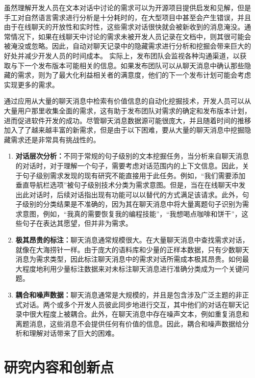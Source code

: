 虽然理解开发人员在文本对话中讨论的需求可以为开源项目提供启发和见解，但是手工对自然语言需求进行分析是十分耗时的，在大型项目中甚至会产生错误\cite{vlas2012two}，并且由于在线聊天的开放性和实时性，这些需求对话很快就会被新收到的消息淹没。通常情况下，如果在线聊天中讨论的需求未被开发人员记录在文档中，则其很可能会被淹没或忽略。因此，自动对聊天记录中的隐藏需求进行分析和挖掘会带来巨大的好处并减少开发人员的时间成本。
实际上，发布团队会监视各种沟通渠道，以获取与下一个发布版本可能相关的信息。如果发布团队可以从聊天消息中确认那些隐藏的需求，则为了最大化利益相关者的满意度，他们的下一个发布计划可能会考虑实现更多的需求。

通过应用从大量的聊天消息中检索有价值信息的自动化挖掘技术，开发人员可以从大量用户那里收集全面的需求，这有助于发布团队对需求的确定和发布版本计划，进而促进软件开发的成功。尽管聊天消息数据源可能很庞大，并且随着时间的推移加入了了越来越丰富的新需求，但是由于以下困难，要从大量的聊天消息中挖掘隐藏需求还是非常具有挑战性的。
\begin{enumerate}
    \item \textbf{对话层次分析：}不同于常规的句子级别的文本挖掘任务，当分析来自聊天消息的对话时，对于理解一个句子，需要考虑对话范围内的上下文信息。因此，关于句子级别需求发现的现有研究不能直接用于此任务。例如，“我们需要添加垂直导航栏选项”被句子级别技术分类为需求意图。但是，当在在线聊天中发出此对话时，后续对话指出现有功能可以以替代的方式满足该请求。此外，句子级别的分类结果是不准确的，因为其在聊天消息中将大量离题句子识别为需求意图，例如，“我真的需要恢复我的编程技能”，“我想喝点咖啡和饼干”，这些句子在表达其愿望，但并非为需求。
    \item \textbf{极其昂贵的标注：}聊天消息通常规模很大。在大量聊天消息中查找需求对话，就像在大海捞针一样。由于庞大的语料库和少量的正样本数据，只有少数聊天消息为需求类型，因此标注聊天消息中的需求对话所需成本极其昂贵。如何最大程度地利用少量标注数据来对未标注聊天消息进行准确分类成为一个关键问题。
    \item \textbf{耦合和噪声数据：}聊天消息通常是大规模的，并且是包含涉及广泛主题的非正式对话。两个或多个开发人员彼此同步地进行交互，其中他们的对话在聊天记录中很大程度上被耦合。此外，在聊天消息中存在噪声文本，例如重复消息和离题消息，这些消息不会提供任何有价值的信息。因此，耦合和噪声数据给分析和理解对话带来了巨大的困难。
\end{enumerate}

\section{研究内容和创新点}

